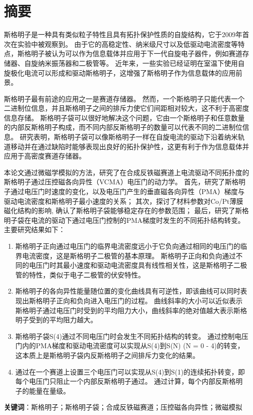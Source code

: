 \chapter*{摘要}
斯格明子是一种具有类似粒子特性且具有拓扑保护性质的自旋结构，它于2009年首次在实验中被观察到。
由于它的高稳定性、纳米级尺寸以及低驱动电流密度等特点，斯格明子被认为可以作为信息载体并应用于下一代自旋电子器件，例如赛道存储器、自旋纳米振荡器和二极管等。
近年来，一些实验已经证明在室温下使用自旋极化电流可以形成和驱动斯格明子，这增强了斯格明子作为信息载体的应用前景。\par
斯格明子最有前途的应用之一是赛道存储器。
然而，一个斯格明子只能代表一个二进制位信息，并且斯格明子之间的排斥力使它们间距相对较大，这不利于高密度信息存储。
斯格明子袋可以很好地解决这个问题，它由一个斯格明子和任意数量的内部反斯格明子构成，而不同内部反斯格明子的数量可以代表不同的二进制位信息。
研究表明，斯格明子袋可以像斯格明子一样在自旋电流的驱动下沿着纳米轨道移动并在通过缺陷时能够表现出良好的拓扑保护性，这更有利于作为信息载体并应用于高密度赛道存储器。\par
本论文通过微磁学模拟的方法，研究了在合成反铁磁赛道上电流驱动不同拓扑度的斯格明子通过压控磁各向异性（VCMA）电压门的动力学。
首先，研究了斯格明子通过电压门时速度的变化，以及电压门产生的垂直磁各向异性（PMA）梯度与驱动电流密度和斯格明子最小速度的关系；
其次，探讨了材料参数对Co/Pt薄膜磁化结构的影响, 确认了斯格明子袋能够稳定存在的参数范围；
最后，研究了斯格明子袋在电流的驱动下通过电压门控制的PMA梯度时发生的不同拓扑结构转变。
主要研究结果如下：
\begin{enumerate}[label=(\arabic*), leftmargin=4ex, labelsep=1.4ex, itemsep=0pt, topsep=1ex,partopsep=1ex,parsep=0pt]
    \item 斯格明子正向通过电压门的临界电流密度远小于它负向通过相同的电压门的临界电流密度，这是斯格明子二极管的基本原理。
    斯格明子正向和负向通过不同的电压门时其最小速度和驱动电流密度具有线性相关性，这是斯格明子二极管的特性，类似于电子二极管的伏安特性。
    \item 斯格明子的各向异性能量随位置的变化曲线具有可逆性，即该曲线可以同时表现出斯格明子正向和负向进入电压门的过程。
    曲线斜率的大小可以近似表示斯格明子通过电压门时受到的平均阻力大小，曲线斜率的绝对值越大表示斯格明子受到的平均阻力越大。
    \item 斯格明子袋S(4)通过不同电压门时会发生不同拓扑结构的转变。
    通过控制电压门内的PMA梯度和驱动电流密度可以实现从S(4)到S(N) (N = 0 - 4)的转变，这本质上是斯格明子袋内反斯格明子之间排斥力变化的结果。
    \item 通过在一个赛道上设置三个电压门可以实现从S(4)到S(1)的连续拓扑转变，即每个电压门只阻止一个内部反斯格明子通过。
    通过计算，每个内部反斯格明子的能量在量级。
\end{enumerate}
\vspace{1em}
\textbf{关键词}：斯格明子；斯格明子袋；合成反铁磁赛道；压控磁各向异性；微磁模拟
\newpage
\thispagestyle{empty}